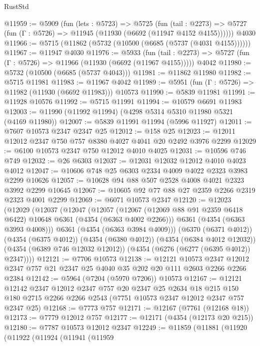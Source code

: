 \begin{lexlean}{RustStd}
\begin{coremodule}
@11959 := @5909
    (fun (lets : @5723) =>
    @5725
      (fun (tail : @2273) =>
      @5727 (fun (Γ : @5726) => @11945 (@11930 (@6692 (@11947 @4152 @4155))))))
    @4030
@11966 := @5715 (@11862 (@5732 (@10500 (@6685 (@5737 (@4031 @4155))))))
@11967 := @11947 @4030
@11976 := @5933
    (fun (tail : @2273) => @5727 (fun (Γ : @5726) => @11966 (@11930 (@6692 (@11967 @4155)))))
    @4042
@11980 := @5732 (@10500 (@6685 (@5737 @4043)))
@11981 := @11862 @11980
@11982 := @5715 @11981
@11983 := @11967 @4042
@11989 := @5951 (fun (Γ : @5726) => @11982 (@11930 (@6692 @11983))) @10573
@11990 := @5839 @11981
@11991 := @11928 @10576
@11992 := @5715 @11991
@11994 := @10579 @6691 @11983
@12003 := @11990 (@11992 @11994) (@4298 @5314 @5310 @11980 @5321 (@4169 @11980))
@12007 := @5839 @11991 @11994 (@5996 @11927)
@12011 := @7607 @10573 @2347 @2347 @25
@12012 := @158 @25
@12023 := @12011 @12012 @2347 @750 @757 @8380 @4027 @4041 @20 @2492 @3976 @2299
@12029 := @6100 @10573 @2347 @750 @12012 @4010 @4025
@12031 := @10596 @746 @749
@12032 := @26 @6303
@12037 := @12031 @12032 @12012 @4010 @4023 @4012
@12047 := @10606 @748 @25 @6303 @2334 @4009 @4022 @2323 @3983 @2299 @10626
@12057 := @10628 @94 @88 @507 @2528 @4008 @4021 @2323 @3992 @2299 @10645
@12067 := @10605 @92 @77 @88 @27 @2359 @2266 @2319 @2323 @4001 @2299
@12069 := @6071 @10573 @2347
@12120 := @12023
    (@12029
      (@12037
        (@12047
          (@12057
            (@12067 (@12069 @88 @91 @2359 @6418 @6422) @10648 @6361 (@4354 (@6363 @4002 @2266)))
            @6361
            (@4354 (@6363 @3993 @4008)))
          @6361
          (@4354 (@6363 @3984 @4009)))
        (@6370 (@6371 @4012))
        (@4354 (@6375 @4012))
        (@4354 (@6380 @4012))
        (@4354 (@6384 @4012 @12032))
        (@4354 (@6389 @746 @12032 @12012))
        (@4354 (@6276 (@6277 (@6395 @4012)) @2347))))
@12121 := @7706 @10573
@12138 := @12121
    @10573
    @2347
    @12012
    @2347
    @757
    @21
    @2347
    @25
    @4040
    @35
    @202
    @20
    @111
    @2603
    @2266
    @2266
    @2384
@12142 := @5964 (@7204 (@5970 @7206)) @10573
@12167 := @12121
    @12142
    @2347
    @12012
    @2347
    @757
    @20
    @2347
    @25
    @2634
    @18
    @215
    @150
    @180
    @2715
    @2266
    @2266
    @2543
    (@7751 @10573 @2347 @12012 @2347 @757 @2347 @25)
@12168 := @7773 @757
@12171 := @12167 (@7761 (@12168 @18))
@12173 := @7779 @12012 @757
@12177 := @12171 (@4354 (@12173 @20 @215))
@12180 := @7787 @10573 @12012 @2347
@12249 := @11859
    (@11881
      (@11920
        (@11922
          (@11924
            (@11941
              (@11959

\end{coremodule}
\end{lexlean}
